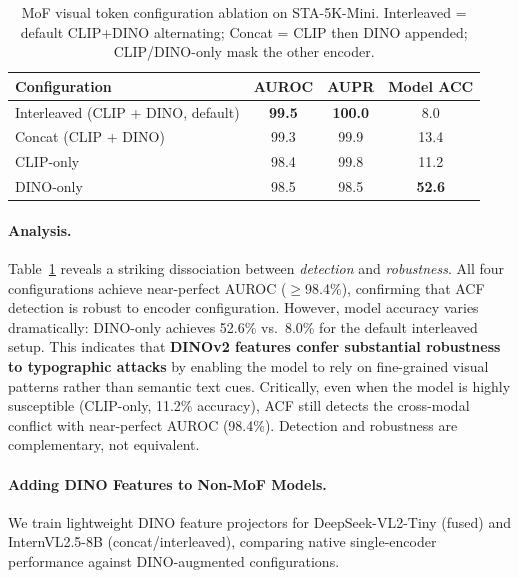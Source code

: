 \documentclass[preprint,12pt]{elsarticle}
\begin{document}
\begin{table}[t]
\centering
\caption{MoF visual token configuration ablation on STA-5K-Mini. Interleaved = default CLIP+DINO alternating; Concat = CLIP then DINO appended; CLIP/DINO-only mask the other encoder.}
\label{tab:mof_dino}
\setlength{\tabcolsep}{4pt}
\begin{tabular}{@{}l c c c@{}}
\toprule
Configuration & AUROC & AUPR & Model ACC \\
\midrule
Interleaved (CLIP + DINO, default) & \textbf{99.5} & \textbf{100.0} & 8.0 \\
Concat (CLIP + DINO)               & 99.3 & 99.9 & 13.4 \\
CLIP-only                           & 98.4 & 99.8 & 11.2 \\
DINO-only                           & 98.5 & 98.5 & \textbf{52.6} \\
\bottomrule
\end{tabular}
\end{table}

\paragraph{Analysis.} Table~\ref{tab:mof_dino} reveals a striking dissociation between \textit{detection} and \textit{robustness}. All four configurations achieve near-perfect AUROC ($\geq$98.4\%), confirming that ACF detection is robust to encoder configuration. However, model accuracy varies dramatically: DINO-only achieves 52.6\% vs.\ 8.0\% for the default interleaved setup. This indicates that \textbf{DINOv2 features confer substantial robustness to typographic attacks} by enabling the model to rely on fine-grained visual patterns rather than semantic text cues. Critically, even when the model is highly susceptible (CLIP-only, 11.2\% accuracy), ACF still detects the cross-modal conflict with near-perfect AUROC (98.4\%). Detection and robustness are complementary, not equivalent.

\paragraph{Adding DINO Features to Non-MoF Models.}
We train lightweight DINO feature projectors for DeepSeek-VL2-Tiny (fused) and InternVL2.5-8B (concat/interleaved), comparing native single-encoder performance against DINO-augmented configurations.
\end{document}

